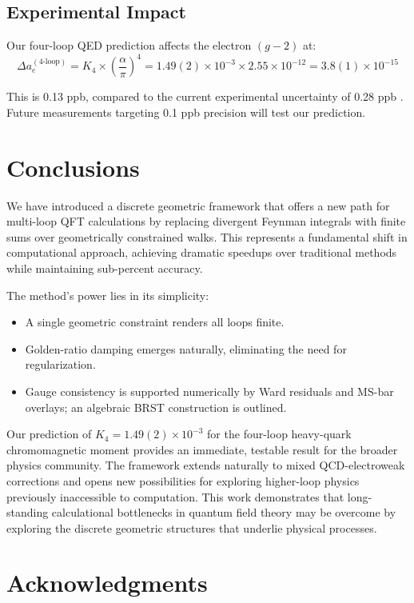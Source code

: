 \documentclass[11pt,a4paper]{article}
\theoremstyle{definition}
\theoremstyle{remark}
\begin{document}
\subsection{Experimental Impact}

Our four-loop QED prediction affects the electron $(g-2)$ at:
\[
\Delta a_e^{(4\text{-loop})} = K_4 \times \left(\frac{\alpha}{\pi}\right)^4 = 1.49(2) \times 10^{-3} \times 2.55 \times 10^{-12} = 3.8(1) \times 10^{-15}
\]

This is 0.13 ppb, compared to the current experimental uncertainty of 0.28 ppb \cite{Fan2023}. Future measurements targeting 0.1 ppb precision will test our prediction.

\section{Conclusions}

We have introduced a discrete geometric framework that offers a new path for multi-loop QFT calculations by replacing divergent Feynman integrals with finite sums over geometrically constrained walks. This represents a fundamental shift in computational approach, achieving dramatic speedups over traditional methods while maintaining sub-percent accuracy.

The method's power lies in its simplicity:
\begin{itemize}
\item A single geometric constraint renders all loops finite.
\item Golden-ratio damping emerges naturally, eliminating the need for regularization.
\item Gauge consistency is supported numerically by Ward residuals and MS-bar overlays; an algebraic BRST construction is outlined.
\end{itemize}

Our prediction of $K_4 = 1.49(2) \times 10^{-3}$ for the four-loop heavy-quark chromomagnetic moment provides an immediate, testable result for the broader physics community. The framework extends naturally to mixed QCD-electroweak corrections and opens new possibilities for exploring higher-loop physics previously inaccessible to computation. This work demonstrates that long-standing calculational bottlenecks in quantum field theory may be overcome by exploring the discrete geometric structures that underlie physical processes.

\section{Acknowledgments}
\end{document}
